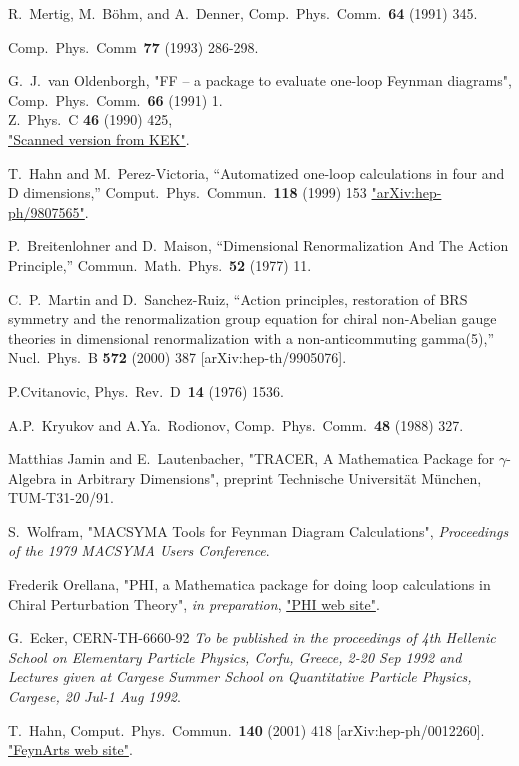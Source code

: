 \begin{thebibliography}{99}
 R.~Mertig, M.~B\"ohm, and A.~Denner,
Comp.~Phys.~Comm.~{\bf 64} (1991) 345. 

Comp.~Phys.~Comm~{\bf 77} (1993) 286-298.

G.~J.~van Oldenborgh, "FF -- a package to evaluate one-loop Feynman diagrams",
Comp.~Phys.~Comm.~{\bf 66} (1991) 1.\\
Z.\ Phys.\ C {\bf 46} (1990) 425,\\
\href{http://ccdb3fs.kek.jp/cgi-bin/img_index?9004168}{"Scanned version from KEK"}.

T.~Hahn and M.~Perez-Victoria,
``Automatized one-loop calculations in four and D dimensions,''
Comput.\ Phys.\ Commun.\  {\bf 118} (1999) 153
\href{http://xxx.lanl.gov/abs/hep-ph/9807565}{"arXiv:hep-ph/9807565"}.

P.~Breitenlohner and D.~Maison,
``Dimensional Renormalization And The Action Principle,''
Commun.\ Math.\ Phys.\  {\bf 52} (1977) 11.

C.~P.~Martin and D.~Sanchez-Ruiz,
``Action principles, restoration of BRS symmetry and the renormalization  group equation for chiral non-Abelian gauge theories in dimensional
renormalization with a non-anticommuting gamma(5),''
Nucl.\ Phys.\ B {\bf 572} (2000) 387
[arXiv:hep-th/9905076].

P.Cvitanovic, Phys.~Rev.~D~{\bf 14} (1976) 1536.

A.P.~Kryukov and A.Ya.~Rodionov, Comp.~Phys.~Comm.~{\bf 48} (1988) 
327.

Matthias Jamin and E.~Lautenbacher, 
"TRACER, A Mathematica Package for $\gamma$-Algebra in Arbitrary Dimensions",
preprint Technische Universit\"at M\"unchen, TUM-T31-20/91.

 S.~Wolfram, "MACSYMA Tools for Feynman Diagram Calculations",
{\sl Proceedings of the 1979 MACSYMA Users Conference}.

 Frederik Orellana, "PHI, a Mathematica package for doing loop calculations in Chiral Perturbation Theory", {\it in preparation}, \href{http://www.feyncalc.org/phi/}{"PHI web site"}.

G.~Ecker,
CERN-TH-6660-92
{\it To be published in the proceedings of 4th Hellenic School on Elementary Particle Physics, Corfu, Greece, 2-20 Sep 1992 and Lectures given at
Cargese Summer School on Quantitative Particle Physics, Cargese, 20 Jul-1 Aug 1992}.

T.~Hahn,
Comput.\ Phys.\ Commun.\  {\bf 140} (2001) 418
[arXiv:hep-ph/0012260].
\href{http://www.feynarts.de/}{"FeynArts web site"}.

\end{thebibliography}
